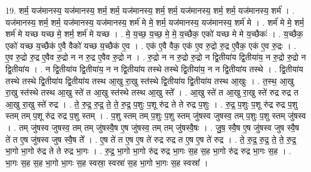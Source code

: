 \documentclass[17pt]{extarticle}
\begin{document}
19. शर्म॒ यज॑मानस्य॒ यज॑मानस्य॒ शर्म॒ शर्म॒ यज॑मानस्य॒ शर्म॒ शर्म॒ यज॑मानस्य॒ शर्म॒ शर्म॒ यज॑मानस्य॒ शर्म॑ । . यज॑मानस्य॒ शर्म॒ शर्म॒ यज॑मानस्य॒ यज॑मानस्य॒ शर्म॑ मे मे॒ शर्म॒ यज॑मानस्य॒ यज॑मानस्य॒ शर्म॑ मे । . शर्म॑ मे मे॒ शर्म॒ शर्म॑ मे यच्छ यच्छ मे॒ शर्म॒ शर्म॑ मे यच्छ । . मे॒ य॒च्छ॒ य॒च्छ॒ मे॒ मे॒ य॒च्छैक॒ एको॑ यच्छ मे मे य॒च्छैकः॑ । . य॒च्छैक॒ एको॑ यच्छ य॒च्छैक॑ ए॒वै वैको॑ यच्छ य॒च्छैक॑ ए॒व । . एक॑ ए॒वै वैक॒ एक॑ ए॒व रु॒द्रो रु॒द्र ए॒वैक॒ एक॑ ए॒व रु॒द्रः । . ए॒व रु॒द्रो रु॒द्र ए॒वैव रु॒द्रो न न रु॒द्र ए॒वैव रु॒द्रो न । . रु॒द्रो न न रु॒द्रो रु॒द्रो न द्वि॒तीया॑य द्वि॒तीया॑य॒ न रु॒द्रो रु॒द्रो न द्वि॒तीया॑य । . न द्वि॒तीया॑य द्वि॒तीया॑य॒ न न द्वि॒तीया॑य तस्थे तस्थे द्वि॒तीया॑य॒ न न द्वि॒तीया॑य तस्थे । . द्वि॒तीया॑य तस्थे तस्थे द्वि॒तीया॑य द्वि॒तीया॑य तस्थ आ॒खु रा॒खु स्त॑स्थे द्वि॒तीया॑य द्वि॒तीया॑य तस्थ आ॒खुः । . त॒स्थ॒ आ॒खु रा॒खु स्त॑स्थे तस्थ आ॒खु स्ते॑ त आ॒खु स्त॑स्थे तस्थ आ॒खु स्ते᳚ । . आ॒खु स्ते॑ त आ॒खु रा॒खु स्ते॑ रुद्र रुद्र त आ॒खु रा॒खु स्ते॑ रुद्र । . ते॒ रु॒द्र॒ रु॒द्र॒ ते॒ ते॒ रु॒द्र॒ प॒शुः प॒शू रु॑द्र ते ते रुद्र प॒शुः । . रु॒द्र॒ प॒शुः प॒शू रु॑द्र रुद्र प॒शु स्तम् तम् प॒शू रु॑द्र रुद्र प॒शु स्तम् । . प॒शु स्तम् तम् प॒शुः प॒शु स्तम् जु॑षस्व जुषस्व॒ तम् प॒शुः प॒शु स्तम् जु॑षस्व । . तम् जु॑षस्व जुषस्व॒ तम् तम् जु॑षस्वै॒ष ए॒ष जु॑षस्व॒ तम् तम् जु॑षस्वै॒षः । . जु॒ष॒ स्वै॒ष ए॒ष जु॑षस्व जुष स्वै॒ष ते॑ त ए॒ष जु॑षस्व जुष स्वै॒ष ते᳚ । . ए॒ष ते॑ त ए॒ष ए॒ष ते॑ रुद्र रुद्र त ए॒ष ए॒ष ते॑ रुद्र । . ते॒ रु॒द्र॒ रु॒द्र॒ ते॒ ते॒ रु॒द्र॒ भा॒गो भा॒गो रु॑द्र ते ते रुद्र भा॒गः । . रु॒द्र॒ भा॒गो भा॒गो रु॑द्र रुद्र भा॒गः स॒ह स॒ह भा॒गो रु॑द्र रुद्र भा॒गः स॒ह । . भा॒गः स॒ह स॒ह भा॒गो भा॒गः स॒ह स्वस्रा॒ स्वस्रा॑ स॒ह भा॒गो भा॒गः स॒ह स्वस्रा᳚ । \newline
\end{document}
